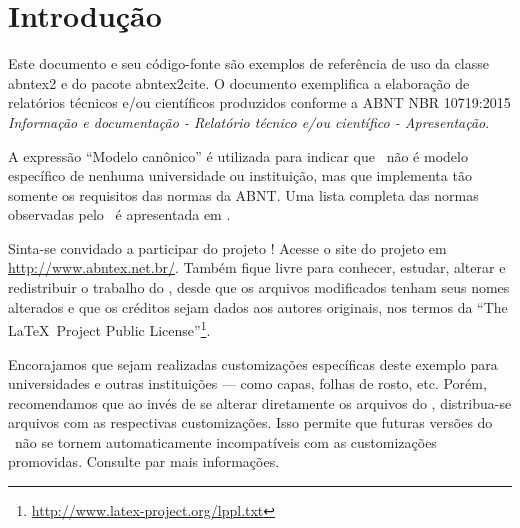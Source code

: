 \documentclass[
	12pt,				%
	openright,			%
	twoside,			%
	a4paper,			%
	english,			%
	french,				%
	spanish,			%
	brazil,				%
	]{abntex2}
\begin{document}

\tableofcontents*
\cleardoublepage


\textual

\chapter{Introdução}

Este documento e seu código-fonte são exemplos de referência de uso da classe
\textsf{abntex2} e do pacote \textsf{abntex2cite}. O documento 
exemplifica a elaboração de relatórios técnicos e/ou científicos produzidos
conforme a ABNT NBR 10719:2015 \emph{Informação e documentação - Relatório
técnico e/ou científico - Apresentação}.

A expressão ``Modelo canônico'' é utilizada para indicar que \abnTeX\ não é
modelo específico de nenhuma universidade ou instituição, mas que implementa tão
somente os requisitos das normas da ABNT. Uma lista completa das normas
observadas pelo \abnTeX\ é apresentada em .

Sinta-se convidado a participar do projeto \abnTeX! Acesse o site do projeto em
\url{http://www.abntex.net.br/}. Também fique livre para conhecer,
estudar, alterar e redistribuir o trabalho do \abnTeX, desde que os arquivos
modificados tenham seus nomes alterados e que os créditos sejam dados aos
autores originais, nos termos da ``The \LaTeX\ Project Public
License''\footnote{\url{http://www.latex-project.org/lppl.txt}}.

Encorajamos que sejam realizadas customizações específicas deste exemplo para
universidades e outras instituições --- como capas, folhas de rosto, etc.
Porém, recomendamos que ao invés de se alterar diretamente os arquivos do
\abnTeX, distribua-se arquivos com as respectivas customizações.
Isso permite que futuras versões do \abnTeX~não se tornem automaticamente
incompatíveis com as customizações promovidas. Consulte
 par mais informações.
\end{document}
